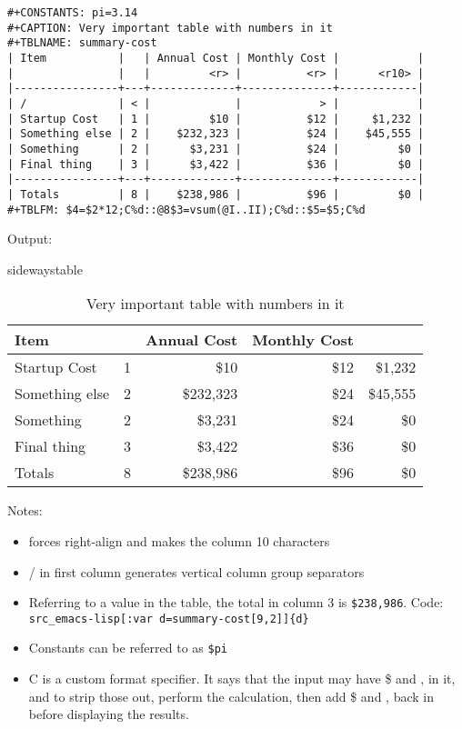 \documentclass[11pt]{article}
\begin{document}
\begin{verbatim}
#+CONSTANTS: pi=3.14
#+CAPTION: Very important table with numbers in it
#+TBLNAME: summary-cost 
| Item           |   | Annual Cost | Monthly Cost |            |
|                |   |         <r> |          <r> |      <r10> |
|----------------+---+-------------+--------------+------------|
| /              | < |             |            > |            |
| Startup Cost   | 1 |         $10 |          $12 |     $1,232 |
| Something else | 2 |    $232,323 |          $24 |    $45,555 |
| Something      | 2 |      $3,231 |          $24 |         $0 |
| Final thing    | 3 |      $3,422 |          $36 |         $0 |
|----------------+---+-------------+--------------+------------|
| Totals         | 8 |    $238,986 |          $96 |         $0 |
#+TBLFM: $4=$2*12;C%d::@8$3=vsum(@I..II);C%d::$5=$5;C%d
\end{verbatim}

Output:


\begin{table}sidewaystable
\caption{\label{summary-cost}Very important table with numbers in it}
\centering
\begin{tabular}{l|rrr|r}
Item &  & Annual Cost & Monthly Cost & \\
\hline
Startup Cost & 1 & \$10 & \$12 & \$1,232\\
Something else & 2 & \$232,323 & \$24 & \$45,555\\
Something & 2 & \$3,231 & \$24 & \$0\\
Final thing & 3 & \$3,422 & \$36 & \$0\\
\hline
Totals & 8 & \$238,986 & \$96 & \$0\\
\end{tabular}
\end{table}


Notes:
\begin{itemize}
\item <r10> forces right-align and makes the column 10 characters
\item / in first column generates vertical column group separators
\item Referring to a value in the table, the total in column 3 is \texttt{\$238,986}. Code: \verb~src_emacs-lisp[:var d=summary-cost[9,2]]{d}~
\item Constants can be referred to as \verb~$pi~
\item C is a custom format specifier. It says that the input may have \$ and , in it, and to strip those out, perform the calculation, then add \$ and , back in before displaying the results.
\end{itemize}
\end{document}
